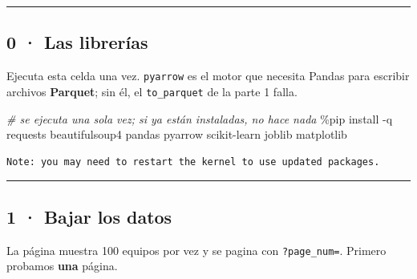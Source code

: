 \documentclass[
]{article}
\newenvironment{Shaded}{}{}
\newcommand{\CommentTok}[1]{\textcolor[rgb]{0.38,0.63,0.69}{\textit{#1}}}
\newcommand{\NormalTok}[1]{#1}
\newcommand{\OperatorTok}[1]{\textcolor[rgb]{0.40,0.40,0.40}{#1}}
\begin{document}
\protect{}\label{6ea3c1a2}
\begin{center}\rule{0.5\linewidth}{0.5pt}\end{center}

\subsection{0 · Las librerías}\label{0--las-libreruxedas}

Ejecuta esta celda una vez. \texttt{pyarrow} es el motor que necesita
Pandas para escribir archivos \textbf{Parquet}; sin él, el
\texttt{to\_parquet} de la parte 1 falla.

\protect{}\label{e40e74a9}
\begin{Shaded}
\begin{Highlighting}[]
\CommentTok{\# se ejecuta una sola vez; si ya están instaladas, no hace nada}
\OperatorTok{\%}\NormalTok{pip install }\OperatorTok{{-}}\NormalTok{q requests beautifulsoup4 pandas pyarrow scikit}\OperatorTok{{-}}\NormalTok{learn joblib matplotlib}
\end{Highlighting}
\end{Shaded}

\begin{verbatim}
Note: you may need to restart the kernel to use updated packages.
\end{verbatim}

\protect{}\label{494fabd0}
\begin{center}\rule{0.5\linewidth}{0.5pt}\end{center}

\subsection{1 · Bajar los datos}\label{1--bajar-los-datos}

La página muestra 100 equipos por vez y se pagina con
\texttt{?page\_num=}. Primero probamos \textbf{una} página.
\end{document}
